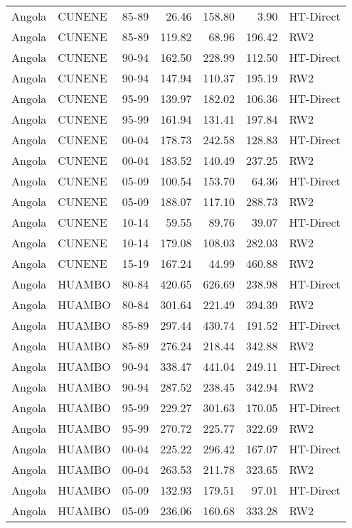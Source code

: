 \begin{longtable}{lllrrrl}
  Angola & CUNENE & 85-89 & 26.46 & 158.80 & 3.90 & HT-Direct \\ 
  Angola & CUNENE & 85-89 & 119.82 & 68.96 & 196.42 & RW2 \\ 
  Angola & CUNENE & 90-94 & 162.50 & 228.99 & 112.50 & HT-Direct \\ 
  Angola & CUNENE & 90-94 & 147.94 & 110.37 & 195.19 & RW2 \\ 
  Angola & CUNENE & 95-99 & 139.97 & 182.02 & 106.36 & HT-Direct \\ 
  Angola & CUNENE & 95-99 & 161.94 & 131.41 & 197.84 & RW2 \\ 
  Angola & CUNENE & 00-04 & 178.73 & 242.58 & 128.83 & HT-Direct \\ 
  Angola & CUNENE & 00-04 & 183.52 & 140.49 & 237.25 & RW2 \\ 
  Angola & CUNENE & 05-09 & 100.54 & 153.70 & 64.36 & HT-Direct \\ 
  Angola & CUNENE & 05-09 & 188.07 & 117.10 & 288.73 & RW2 \\ 
  Angola & CUNENE & 10-14 & 59.55 & 89.76 & 39.07 & HT-Direct \\ 
  Angola & CUNENE & 10-14 & 179.08 & 108.03 & 282.03 & RW2 \\ 
  Angola & CUNENE & 15-19 & 167.24 & 44.99 & 460.88 & RW2 \\ 
  Angola & HUAMBO & 80-84 & 420.65 & 626.69 & 238.98 & HT-Direct \\ 
  Angola & HUAMBO & 80-84 & 301.64 & 221.49 & 394.39 & RW2 \\ 
  Angola & HUAMBO & 85-89 & 297.44 & 430.74 & 191.52 & HT-Direct \\ 
  Angola & HUAMBO & 85-89 & 276.24 & 218.44 & 342.88 & RW2 \\ 
  Angola & HUAMBO & 90-94 & 338.47 & 441.04 & 249.11 & HT-Direct \\ 
  Angola & HUAMBO & 90-94 & 287.52 & 238.45 & 342.94 & RW2 \\ 
  Angola & HUAMBO & 95-99 & 229.27 & 301.63 & 170.05 & HT-Direct \\ 
  Angola & HUAMBO & 95-99 & 270.72 & 225.77 & 322.69 & RW2 \\ 
  Angola & HUAMBO & 00-04 & 225.22 & 296.42 & 167.07 & HT-Direct \\ 
  Angola & HUAMBO & 00-04 & 263.53 & 211.78 & 323.65 & RW2 \\ 
  Angola & HUAMBO & 05-09 & 132.93 & 179.51 & 97.01 & HT-Direct \\ 
  Angola & HUAMBO & 05-09 & 236.06 & 160.68 & 333.28 & RW2 \\ 

\end{longtable}
